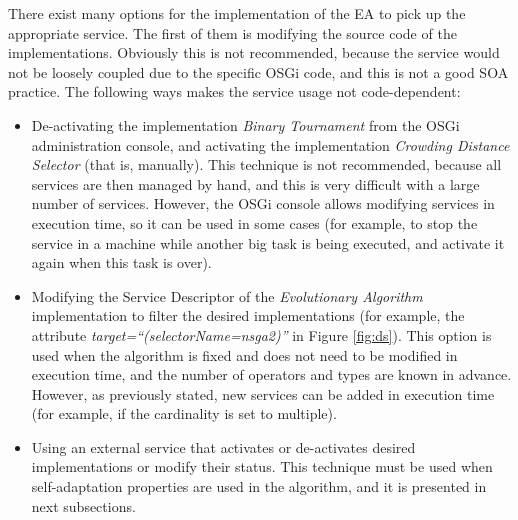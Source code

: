 There exist many options for the implementation of the EA to pick up the appropriate
service. %
 The first of them is modifying the source code of the
 implementations. Obviously this is not recommended, because the
 service would not be loosely coupled due to the specific OSGi code,
 and this is not a good SOA practice. The following ways makes the
 service usage not code-dependent: 


\begin{itemize}
\item De-activating the implementation {\em Binary Tournament} from the OSGi administration console, and activating the implementation {\em Crowding Distance Selector} (that is, manually). This technique is not recommended, because all services are then managed by hand, and this is very difficult with a large number of services. However, the OSGi console allows modifying services in execution time, so it can be used in some cases (for example, to stop the service in a machine while another big task is being executed, and activate it again when this task is over).
\item Modifying the Service Descriptor of the {\em Evolutionary Algorithm} implementation to filter the desired implementations (for example, the attribute {\em target\-=``(selectorName\-=nsga2)''} in Figure \ref{fig:ds}). This option is used when the algorithm is fixed and does not need to be modified in execution time, and the number of operators and types are known in advance. However, as previously stated, new services can be added in execution time (for example, if the cardinality is set to multiple).
\item Using an external service that activates or de-activates desired implementations or modify their status. This technique must be used when self-adaptation properties are used in the algorithm, and it is presented in next subsections. 
\end{itemize}


